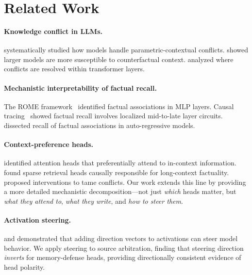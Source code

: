 \documentclass{article}
\begin{document}
\section{Related Work}
\label{sec:related}

\paragraph{Knowledge conflict in LLMs.}
\citet{longpre2021entity} systematically studied how models handle parametric-contextual conflicts. \citet{chen2022rich} showed larger models are more susceptible to counterfactual context. \citet{jin2024knowledge} analyzed where conflicts are resolved within transformer layers.

\paragraph{Mechanistic interpretability of factual recall.}
The ROME framework~\citep{meng2022rome} identified factual associations in MLP layers. Causal tracing~\citep{meng2023mass} showed factual recall involves localized mid-to-late layer circuits. \citet{geva2023dissecting} dissected recall of factual associations in auto-regressive models.

\paragraph{Context-preference heads.}
\citet{shi2024context} identified attention heads that preferentially attend to in-context information. \citet{wu2024retrieval} found sparse retrieval heads causally responsible for long-context factuality. \citet{wolfson2025taming} proposed interventions to tame conflicts. Our work extends this line by providing a more detailed mechanistic decomposition---not just \emph{which} heads matter, but \emph{what they attend to}, \emph{what they write}, and \emph{how to steer them}.

\paragraph{Activation steering.}
\citet{li2024inference} and \citet{turner2024activation} demonstrated that adding direction vectors to activations can steer model behavior. We apply steering to source arbitration, finding that steering direction \emph{inverts} for memory-defense heads, providing directionally consistent evidence of head polarity.

\end{document}
